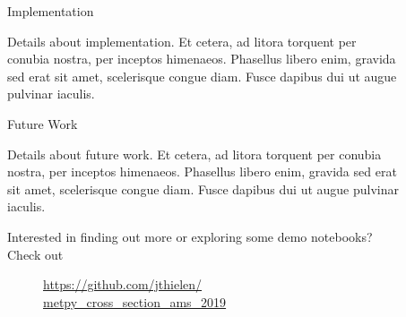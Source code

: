 \documentclass[final]{beamer}
\newlength{\sepwidth}
\newlength{\colwidth}
\newcommand{\separatorcolumn}{\begin{column}{\sepwidth}\end{column}}
\begin{document}
\begin{frame}[t, fragile]
\begin{columns}[t]
\begin{column}{\colwidth}
\begin{exampleblock}
  \end{exampleblock}

\end{column}

\separatorcolumn

\begin{column}{\colwidth}

  \begin{block}{Implementation}

    Details about implementation. Et cetera,  ad litora torquent per conubia nostra, per
    inceptos himenaeos. Phasellus libero enim, gravida sed erat sit amet,
    scelerisque congue diam. Fusce dapibus dui ut augue pulvinar iaculis.

  \end{block}

  \begin{block}{Future Work}

    Details about future work. Et cetera,  ad litora torquent per conubia nostra, per
    inceptos himenaeos. Phasellus libero enim, gravida sed erat sit amet,
    scelerisque congue diam. Fusce dapibus dui ut augue pulvinar iaculis.

  \end{block}

  \begin{exampleblock}

    Interested in finding out more or exploring some demo notebooks? Check out

    \vspace{1em} 



    \begin{figure}
      \centering
      \large{\url{https://github.com/jthielen/}\\ \url{metpy_cross_section_ams_2019}}

      \vspace{1em}

    \end{figure}

  \end{exampleblock}

\end{column}

\separatorcolumn
\end{columns}
\end{frame}
\end{document}
